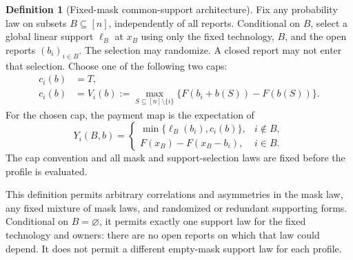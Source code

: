 \documentclass[11pt]{article}
\theoremstyle{definition}\newtheorem{definition}[theorem]{Definition}
\theoremstyle{remark}\newtheorem{remark}[theorem]{Remark}
\begin{document}
\begin{definition}[Fixed-mask common-support architecture]\label{arch:def}
Fix any probability law on subsets $B\subseteq[n]$, independently of all
reports. Conditional on $B$, select a global linear support $\ell_B$ at $x_B$
using only the fixed technology, $B$, and the open reports $(b_i)_{i\in B}$.
The selection may randomize. A closed report may not enter that selection.
Choose one of the following two caps:
\begin{align}
 c_i(b)&=T,\label{arch:tcap}\\
 c_i(b)&=V_i(b):=
 \max_{S\subseteq[n]\setminus\{i\}}
       \{F(b_i+b(S))-F(b(S))\}.\label{arch:vcap}
\end{align}
For the chosen cap, the payment map is the expectation of
\begin{equation}\label{arch:maskpay}
 Y_i(B,b)=
 \begin{cases}
 \min\{\ell_B(b_i),c_i(b)\},&i\notin B,\\
 F(x_B)-F(x_B-b_i),&i\in B.
 \end{cases}
\end{equation}
The cap convention and all mask and support-selection laws are fixed before
the profile is evaluated.
\end{definition}

This definition permits arbitrary correlations and asymmetries in the mask
law, any fixed mixture of mask laws, and randomized or redundant supporting
forms. Conditional on $B=\varnothing$, it permits exactly one support law for
the fixed technology and owners: there are no open reports on which that law
could depend. It does not permit a different empty-mask support law for each
profile.
\end{document}
